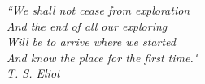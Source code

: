 \pagebreak
\hspace{0pt}
\vfill
\begin{centering}
\noindent\emph{``We shall not cease from exploration\\
And the end of all our exploring \\
Will be to arrive where we started \\
And know the place for the first time."\\
\emph{T. S. Eliot}}\\ 
\end{centering}
\vfill
\hspace{0pt}
\pagebreak





